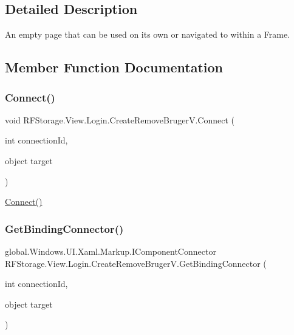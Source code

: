 \subsection{Detailed Description}
An empty page that can be used on its own or navigated to within a Frame. 



\subsection{Member Function Documentation}
\mbox{\label{class_r_f_storage_1_1_view_1_1_login_1_1_create_remove_bruger_v_a797546394ebe1579ec8b64e239fb2fe7}} 
\subsubsection{\texorpdfstring{Connect()}{Connect()}}
{\footnotesize\ttfamily void R\+F\+Storage.\+View.\+Login.\+Create\+Remove\+Bruger\+V.\+Connect (\begin{DoxyParamCaption}\item[{int}]{connection\+Id,  }\item[{object}]{target }\end{DoxyParamCaption})}



\mbox{\hyperlink{class_r_f_storage_1_1_view_1_1_login_1_1_create_remove_bruger_v_a797546394ebe1579ec8b64e239fb2fe7}{Connect()}} 

\mbox{\label{class_r_f_storage_1_1_view_1_1_login_1_1_create_remove_bruger_v_ab7e9d9835e1b23bd9e7fdc5d3fa6e032}} 
\subsubsection{\texorpdfstring{GetBindingConnector()}{GetBindingConnector()}}
{\footnotesize\ttfamily global.\+Windows.\+U\+I.\+Xaml.\+Markup.\+I\+Component\+Connector R\+F\+Storage.\+View.\+Login.\+Create\+Remove\+Bruger\+V.\+Get\+Binding\+Connector (\begin{DoxyParamCaption}\item[{int}]{connection\+Id,  }\item[{object}]{target }\end{DoxyParamCaption})}



